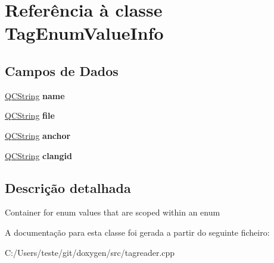 \hypertarget{class_tag_enum_value_info}{\section{Referência à classe Tag\-Enum\-Value\-Info}
\label{class_tag_enum_value_info}
}
\subsection*{Campos de Dados}
\begin{DoxyCompactItemize}
\item 
\hypertarget{class_tag_enum_value_info_adc0097c7bd1e61ad32058fcde425bc7a}{\hyperlink{class_q_c_string}{Q\-C\-String} {\bfseries name}}\label{class_tag_enum_value_info_adc0097c7bd1e61ad32058fcde425bc7a}

\item 
\hypertarget{class_tag_enum_value_info_afeb3e9dc965e44d291bbce99ea8dbcc7}{\hyperlink{class_q_c_string}{Q\-C\-String} {\bfseries file}}\label{class_tag_enum_value_info_afeb3e9dc965e44d291bbce99ea8dbcc7}

\item 
\hypertarget{class_tag_enum_value_info_a77f4824b029885f469aa2903eabf92d4}{\hyperlink{class_q_c_string}{Q\-C\-String} {\bfseries anchor}}\label{class_tag_enum_value_info_a77f4824b029885f469aa2903eabf92d4}

\item 
\hypertarget{class_tag_enum_value_info_a5de91292aa20214d2fd16ea5c5ab81d6}{\hyperlink{class_q_c_string}{Q\-C\-String} {\bfseries clangid}}\label{class_tag_enum_value_info_a5de91292aa20214d2fd16ea5c5ab81d6}

\end{DoxyCompactItemize}


\subsection{Descrição detalhada}
Container for enum values that are scoped within an enum 

A documentação para esta classe foi gerada a partir do seguinte ficheiro\-:\begin{DoxyCompactItemize}
\item 
C\-:/\-Users/teste/git/doxygen/src/tagreader.\-cpp\end{DoxyCompactItemize}

